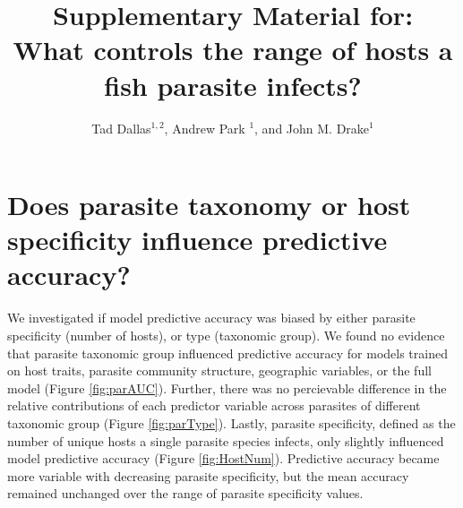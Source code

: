 \documentclass[12pt]{article}
\title{Supplementary Material for: \\
What controls the range of hosts a fish parasite infects?}
\author{Tad Dallas$^{1,2}$, Andrew Park $^{1}$, and John M. Drake$^{1}$}
\begin{document}
 

\maketitle{}
\doublespacing

\section{Does parasite taxonomy or host specificity influence predictive accuracy?}

We investigated if model predictive accuracy was biased by either parasite specificity (number of hosts), or type (taxonomic group). We found no evidence that parasite taxonomic group influenced predictive accuracy for models trained on host traits, parasite community structure, geographic variables, or the full model (Figure \ref{fig:parAUC}). Further, there was no percievable difference in the relative contributions of each predictor variable across parasites of different taxonomic group (Figure \ref{fig:parType}). Lastly, parasite specificity, defined as the number of unique hosts a single parasite species infects, only slightly influenced model predictive accuracy (Figure \ref{fig:HostNum}). Predictive accuracy became more variable with decreasing parasite specificity, but the mean accuracy remained unchanged over the range of parasite specificity values. 





 \newpage
\end{document}
